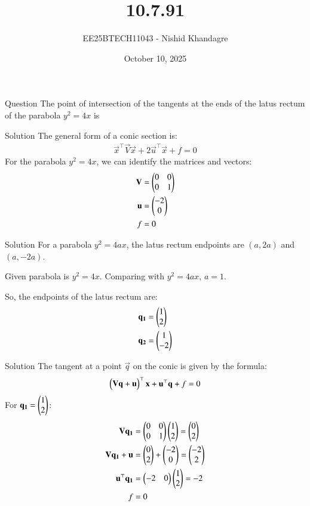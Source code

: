 \documentclass{beamer}
\title
{10.7.91}
\date{October 10, 2025}
\author
{EE25BTECH11043 - Nishid Khandagre}
\begin{document}
\frame{\titlepage}

\begin{frame}{Question}
The point of intersection of the tangents at the ends of the latus rectum of the parabola $y^2 = 4x$ is
\end{frame}

\begin{frame}{Solution}
The general form of a conic section is:
\begin{align}
\vec{x}^{\top}\vec{V}\vec{x} + 2\vec{u}^{\top}\vec{x} + f = 0
\end{align}
For the parabola $y^2 = 4x$, we can identify the matrices and vectors:
\begin{align}
\mathbf{V} &= \begin{pmatrix}0 & 0 \\ 0 & 1\end{pmatrix} \\
\mathbf{u} &= \begin{pmatrix}-2 \\ 0\end{pmatrix} \\
f &= 0
\end{align}
\end{frame}

\begin{frame}{Solution}
For a parabola $y^2 = 4ax$, the latus rectum endpoints are $(a, 2a)$ and $(a, -2a)$.

Given parabola is $y^2 = 4x$.
Comparing with $y^2 = 4ax$, $a=1$.

So, the endpoints of the latus rectum are:
\begin{align}
\mathbf{q_1} &= \begin{pmatrix}1 \\ 2\end{pmatrix} \\
\mathbf{q_2} &= \begin{pmatrix}1 \\ -2\end{pmatrix}
\end{align}
\end{frame}

\begin{frame}{Solution}
The tangent at a point $\vec{q}$ on the conic is given by the formula:
\begin{align}
\begin{pmatrix}\mathbf{V}\mathbf{q} + \mathbf{u}\end{pmatrix}^{\top}\mathbf{x} + \mathbf{u}^{\top}\mathbf{q} + f = 0
\end{align}
For $\mathbf{q_1} = \begin{pmatrix}1 \\ 2\end{pmatrix}$:
\begin{align}
\mathbf{V}\mathbf{q_1} &= \begin{pmatrix}0 & 0 \\ 0 & 1\end{pmatrix}\begin{pmatrix}1 \\ 2\end{pmatrix} = \begin{pmatrix}0\\ 2\end{pmatrix} \\
\mathbf{V}\mathbf{q_1} + \mathbf{u} &= \begin{pmatrix}0 \\ 2\end{pmatrix} + \begin{pmatrix}-2 \\ 0\end{pmatrix} = \begin{pmatrix}-2 \\ 2\end{pmatrix} \\
\mathbf{u}^{\top}\mathbf{q_1} &= \begin{pmatrix}-2 & 0\end{pmatrix}\begin{pmatrix}1 \\ 2\end{pmatrix} = -2 \\
f &= 0
\end{align}
\end{frame}
\end{document}
